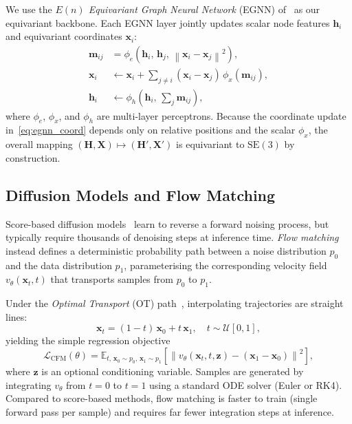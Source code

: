 \documentclass{article}
\newcommand{\SE}{\mathrm{SE}(3)}
\newcommand{\norm}[1]{\left\lVert#1\right\rVert}
\begin{document}
We use the \emph{$E(n)$ Equivariant Graph Neural Network} (EGNN)
of~\citet{satorras2021n} as our equivariant backbone.
Each EGNN layer jointly updates scalar node features $\mathbf{h}_i$
and equivariant coordinates $\mathbf{x}_i$:
\begin{align}
    \mathbf{m}_{ij} &= \phi_e\!\left(\mathbf{h}_i,\, \mathbf{h}_j,\,
                       \norm{\mathbf{x}_i - \mathbf{x}_j}^2\right),
    \label{eq:egnn_msg} \\
    \mathbf{x}_i    &\leftarrow \mathbf{x}_i
                       + \sum_{j \neq i}
                         (\mathbf{x}_i - \mathbf{x}_j)\,
                         \phi_x(\mathbf{m}_{ij}),
    \label{eq:egnn_coord} \\
    \mathbf{h}_i    &\leftarrow \phi_h\!\left(\mathbf{h}_i,\,
                       \sum_{j}\mathbf{m}_{ij}\right),
    \label{eq:egnn_node}
\end{align}
where $\phi_e$, $\phi_x$, and $\phi_h$ are multi-layer perceptrons.
Because the coordinate update in~\eqref{eq:egnn_coord} depends only on
relative positions and the scalar $\phi_x$, the overall mapping
$(\mathbf{H}, \mathbf{X}) \mapsto (\mathbf{H}', \mathbf{X}')$ is
equivariant to $\SE$ by construction.

\subsection{Diffusion Models and Flow Matching}
\label{sec:bg_flow}

Score-based diffusion models~\cite{song2020score} learn to reverse a
forward noising process, but typically require thousands of denoising
steps at inference time.
\emph{Flow matching}~\cite{lipman2022flow} instead defines a
deterministic probability path between a noise distribution $p_0$ and
the data distribution $p_1$, parameterising the corresponding velocity
field $v_\theta(\mathbf{x}_t, t)$ that transports samples from $p_0$
to $p_1$.

Under the \emph{Optimal Transport} (OT) path~\cite{albergo2023building},
interpolating trajectories are straight lines:
\begin{equation}
    \mathbf{x}_t = (1 - t)\,\mathbf{x}_0 + t\,\mathbf{x}_1,
    \quad t \sim \mathcal{U}[0, 1],
\end{equation}
yielding the simple regression objective
\begin{equation}
    \mathcal{L}_\text{CFM}(\theta)
    = \mathbb{E}_{t,\, \mathbf{x}_0 \sim p_0,\, \mathbf{x}_1 \sim p_1}
      \left[ \norm{v_\theta(\mathbf{x}_t, t, \mathbf{z})
             - (\mathbf{x}_1 - \mathbf{x}_0)}^2 \right],
    \label{eq:cfm_loss}
\end{equation}
where $\mathbf{z}$ is an optional conditioning variable.
Samples are generated by integrating $v_\theta$ from $t=0$ to $t=1$
using a standard ODE solver (Euler or RK4).
Compared to score-based methods, flow matching is faster to train
(single forward pass per sample) and requires far fewer integration
steps at inference.
\end{document}

